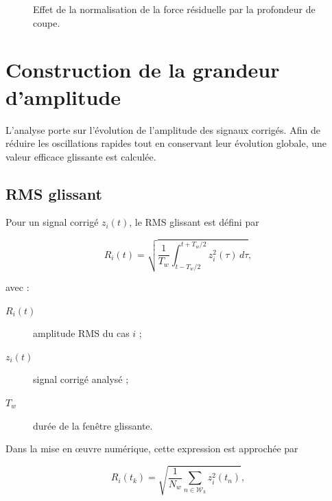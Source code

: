 \documentclass[
    11pt,
    a4paper
]{article}
\begin{document}
\begin{figure}[H]
    \centering
    \caption{Effet de la normalisation de la force résiduelle par la profondeur de coupe.}
    \label{fig:force-normalisee}
\end{figure}



\section{Construction de la grandeur d'amplitude}
\label{sec:amplitude}

L'analyse porte sur l'évolution de l'amplitude des signaux corrigés. Afin de
réduire les oscillations rapides tout en conservant leur évolution globale, une
valeur efficace glissante est calculée.

\subsection{RMS glissant}
\label{subsec:rms-glissant}

Pour un signal corrigé \(z_i(t)\), le RMS glissant est défini par

\begin{equation}
    R_i(t)
    =
    \sqrt{
        \frac{1}{T_w}
        \int_{t-T_w/2}^{t+T_w/2}
        z_i^2(\tau)\,d\tau
    },
    \label{eq:rms-continu}
\end{equation}

avec :

\begin{description}
    \item[\(R_i(t)\)] amplitude RMS du cas \(i\) ;
    \item[\(z_i(t)\)] signal corrigé analysé ;
    \item[\(T_w\)] durée de la fenêtre glissante.
\end{description}

Dans la mise en œuvre numérique, cette expression est approchée par

\begin{equation}
    R_i(t_k)
    =
    \sqrt{
        \frac{1}{N_w}
        \sum_{n\in\mathcal{W}_k}
        z_i^2(t_n)
    },
    \label{eq:rms-discret}
\end{equation}
\end{document}
